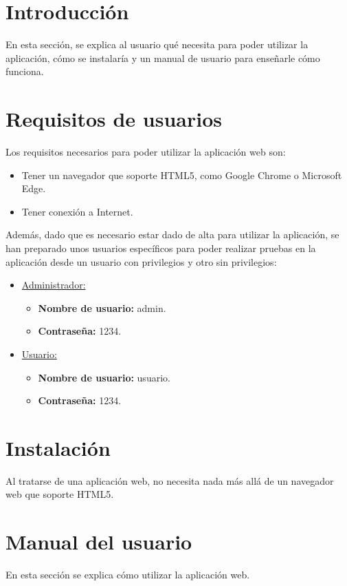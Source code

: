 
\section{Introducción}
En esta sección, se explica al usuario qué necesita para poder utilizar la aplicación, cómo se instalaría y un manual de usuario para enseñarle cómo funciona.

\section{Requisitos de usuarios} \label{requisitos}
Los requisitos necesarios para poder utilizar la aplicación web son:

\begin{itemize}
	\item Tener un navegador que soporte HTML5, como Google Chrome o Microsoft Edge.
	\item Tener conexión a Internet.
\end{itemize}

Además, dado que es necesario estar dado de alta para utilizar la aplicación, se han preparado unos usuarios específicos para poder realizar pruebas en la aplicación desde un usuario con privilegios y otro sin privilegios:

\begin{itemize}
	\item \underline{Administrador:} 
	\begin{itemize}
		\item \textbf{Nombre de usuario:} admin.
		\item \textbf{Contraseña:} 1234.
	\end{itemize}
	\item \underline{Usuario:}
	\begin{itemize}
		\item \textbf{Nombre de usuario:} usuario.
		\item \textbf{Contraseña:} 1234.
	\end{itemize}
\end{itemize}

\section{Instalación}
Al tratarse de una aplicación web, no necesita nada más allá de un navegador web que soporte HTML5.

\section{Manual del usuario}
En esta sección se explica cómo utilizar la aplicación web.

